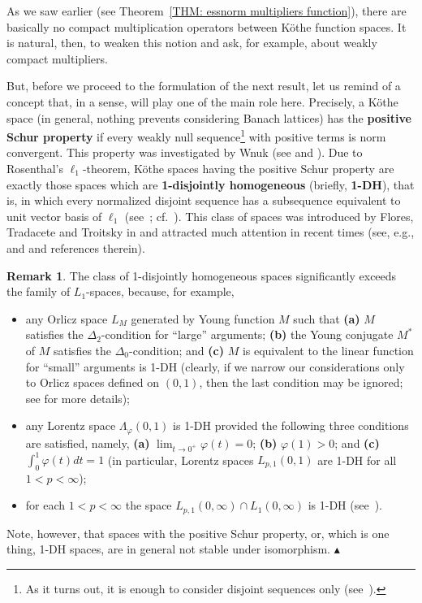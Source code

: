 \documentclass[11pt]{amsart}
\theoremstyle{definition}
\theoremstyle{definition}
\theoremstyle{definition}
\theoremstyle{definition}
\theoremstyle{definition}
\theoremstyle{definition}
\newtheorem{remark}[theorem]{Remark}
\theoremstyle{definition}
\theoremstyle{definition}
\numberwithin{equation}{section}
\numberwithin{equation}{section}
\numberwithin{equation}{section}
\theoremstyle{definition}
\theoremstyle{definition}
\theoremstyle{definition}
\theoremstyle{definition}
\theoremstyle{definition}
\theoremstyle{definition}
\newcommand\xqed[1]{%
	\leavevmode\unskip\penalty9999 \hbox{}\nobreak\hfill
	\quad\hbox{#1}}
\newcommand\demo{\xqed{{\Large $\blacktriangle$}}}
\begin{document}
As we saw earlier (see Theorem~\ref{THM: essnorm multipliers function}), there are basically no compact multiplication operators between K{\" o}the
function spaces. It is natural, then, to weaken this notion and ask, for example, about weakly compact multipliers.

But, before we proceed to the formulation of the next result, let us remind of a concept that, in a sense, will play one of the main role here. 
Precisely, a K{\" o}the space (in general, nothing prevents considering Banach lattices) has the {\bf positive Schur property} if every weakly null
sequence\footnote{As it turns out, it is enough to consider disjoint sequences only (see~\cite[Corollary~2.3.5]{MN91}).} with positive terms is norm
convergent. This property was investigated by Wnuk (see \cite{Wnu93} and \cite{Wnu89}). Due to Rosenthal's $\ell_1$-theorem, K{\" o}the spaces having
the positive Schur property are exactly those spaces which are {\bf 1-disjointly homogeneous} (briefly, {\bf 1-DH}), that is, in which every normalized
disjoint sequence has a subsequence equivalent to unit vector basis of $\ell_1$ (see~\cite[Theorem~7]{Wnu93}; cf.~\cite[Proposition~4.9]{FHSTT14}).
This class of spaces was introduced by Flores, Tradacete and Troitsky in \cite{FTT09} and attracted much attention in recent times (see, e.g., \cite{FHSTT14} and
\cite{LTM22} and references therein).

\begin{remark}
	The class of 1-disjointly homogeneous spaces significantly exceeds the family of $L_1$-spaces, because, for example,
	\begin{itemize}
		\item[$\bullet$] any Orlicz space $L_M$ generated by Young function $M$ such that {\bf (a)} $M$ satisfies the $\Delta_2$-condition for \enquote{large} arguments;
		{\bf (b)} the Young conjugate $M^*$ of $M$ satisfies the $\Delta_0$-condition; and {\bf (c)} $M$ is equivalent to the linear function for \enquote{small} arguments
		is 1-DH (clearly, if we narrow our considerations only to Orlicz spaces defined on $(0,1)$, then the last condition may be ignored; see \cite{LTM22} for more details);
		\item[$\bullet$] any Lorentz space $\Lambda_{\varphi}(0,1)$ is 1-DH provided the following three conditions are satisfied, namely,
		{\bf (a)} $\lim_{t \rightarrow 0^{+}} \varphi(t) = 0$; {\bf (b)} $\varphi(1) > 0$; and {\bf (c)} $\int_0^1 \varphi(t)dt = 1$
		(in particular, Lorentz spaces $L_{p,1}(0,1)$ are 1-DH for all $1 < p < \infty$);
		\item[$\bullet$] for each $1 < p < \infty$ the space $L_{p,1}(0,\infty) \cap L_1(0,\infty)$ is 1-DH (see~\cite[Theorem~8]{LTM22}).
	\end{itemize}
	Note, however, that spaces with the positive Schur property, or, which is one thing, 1-DH spaces, are in general not stable under isomorphism.
	\demo
\end{remark}
\end{document}
